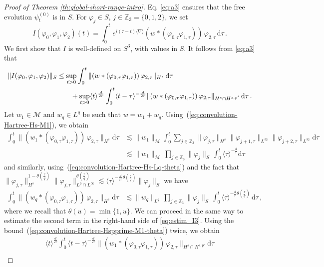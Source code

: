 \documentclass[12pt]{article}
\theoremstyle{plain}
\newcommand{\meas}{\mathcal{M}}
\begin{document}
\begin{proof}[Proof of Theorem \ref{th:global-short-range-intro}]
Eq. \eqref{eq:a3} ensures that the free evolution $\psi_t^{(0)}$ is in $S$.
For $\varphi_{j}\in S$, $j\in\mathbb{Z}_{3}=\{0,1,2\}$, we set
\[
I(\varphi_{0},\varphi_{1},\varphi_{2})(t)=\int_{0}^{t}e^{i(\tau-t)\langle\nabla\rangle}(w*(\varphi_{0,\tau}\varphi_{1,\tau}))\,\varphi_{2,\tau}\,\mathrm{d}\tau\,.
\]
We first show that $I$ is well-defined on $S^{3}$, with values in $S$. It follows from  \eqref{eq:a3} that
\begin{align}
\|I(\varphi_{0},\varphi_{1},\varphi_{2})\|_{S} & \leq\sup_{t>0}\int_{0}^{t}\|(w*(\varphi_{0,\tau}\varphi_{1,\tau}))\,\varphi_{2,\tau}\|_{H^{s}}\,\mathrm{d}\tau\notag\\
 & \qquad+\sup_{t>0}\langle t\rangle^{\frac{d}{2r}}\int_{0}^{t}\langle t-\tau\rangle^{-\frac{d}{2r}}\|(w*(\varphi_{0,\tau}\varphi_{1,\tau}))\,\varphi_{2,\tau}\|_{H^{s}\cap H^{s,p'}}\,\mathrm{d}\tau\,. \label{eq:estim_I3}
\end{align}
Let $w_1\in\meas $ and $w_q\in L^q$ be such that $w=w_1+w_q$. Using~(\ref{eq:convolution-Hartree-Hs-M1}), we obtain
\begin{align*}
\int_{0}^{t}\|(w_{1}*(\varphi_{0,\tau}\varphi_{1,\tau}))\,\varphi_{2,\tau}\|_{H^{s}} \mathrm{d}\tau& \lesssim\|w_{1}\|_{\meas}\int_{0}^{t}\sum_{j\in\mathbb{Z}_{3}}\|\varphi_{j,\tau}\|_{H^{s}}\|\varphi_{j+1,\tau}\|_{L^{\infty}}\|\varphi_{j+2,\tau}\|_{L^{\infty}}\mathrm{d}\tau\\
 & \lesssim\|w_{1}\|_{\meas}\,\prod_{j\in\mathbb{Z}_{3}}\|\varphi_{j}\|_{S}\,\int_{0}^{t}\langle\tau\rangle^{-\frac{d}{r}}\mathrm{d}\tau
\end{align*}
and similarly, using~(\ref{eq:convolution-Hartree-Hs-Lq-theta}) and the fact that $\|\varphi_{j,\tau}\|_{H^s}^{1-\theta(\frac{r}{q})}\|\varphi_{j,\tau}\|^{\theta(\frac{r}{q})}_{L^{p}\cap L^{\infty}}\lesssim \langle \tau \rangle^{-\frac{d}{2r}\theta(\frac{r}{q})} \|\varphi_{j}\|_{S} $ we have
\begin{align*}
\int_{0}^{t}\|(w_{q}*(\varphi_{0,\tau}\varphi_{1,\tau}))\,\varphi_{2,\tau}\|_{H^{s}} \mathrm{d}\tau
 & \lesssim\|w_{q}\|_{L^{q}}\,\prod_{j\in\mathbb{Z}_{3}}\|\varphi_{j}\|_{S}\,\int_{0}^{t}\langle\tau\rangle^{-\frac{d}{r}\theta(\frac{r}{q})}\,\mathrm{d}\tau\,,
\end{align*}
where we recall that $\theta(u)=\min\{1,u\}$. We can proceed in the same way to estimate the second term in the right-hand side of \eqref{eq:estim_I3}. Using the bound~(\ref{eq:convolution-Hartree-Hspprime-M1-theta}) twice, we obtain
\begin{multline*}
\langle t\rangle^{\frac{d}{2r}}\int_{0}^{t}\langle t-\tau\rangle^{-\frac{d}{2r}}\|(w_{1}*(\varphi_{0,\tau}\varphi_{1,\tau}))\,\varphi_{2,\tau}\|_{H^{s}\cap H^{s,p'}}\mathrm{d}\tau\\

\end{multline*}
\end{proof}
\end{document}
